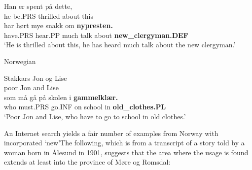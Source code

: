 

 \ea\label{}
\gll Han  er  spent  på  dette,\\


he  be.PRS  thrilled  about  this\\

 \ea\label{}
\gll har  hørt  mye  snakk  om  \textbf{nypresten.} \\


have.PRS  hear.PP  much  talk  about   \textbf{new\_clergyman.DEF} \\

\glt ‘He is thrilled about this, he has heard much talk about the new clergyman.’

\z

\item 

Norwegian 



 \ea\label{}
\gll Stakkars  Jon  og  Lise\\


poor  Jon  and  Lise\\

 \ea\label{}
\gll som  må  gå  på  skolen  i  \textbf{gammelklær.}\\


who  must.PRS  go.INF  on  school  in  \textbf{old\_clothes.PL}\\

\glt ‘Poor Jon and Lise, who have to go to school in old clothes.’

\z

An Internet search yields a fair number of examples from Norway with incorporated  ‘new’The following, which is from a transcript of a story told by a woman born in Ålesund in 1901, suggests that the area where the usage is found extends at least into the province of Møre og Romsdal:



